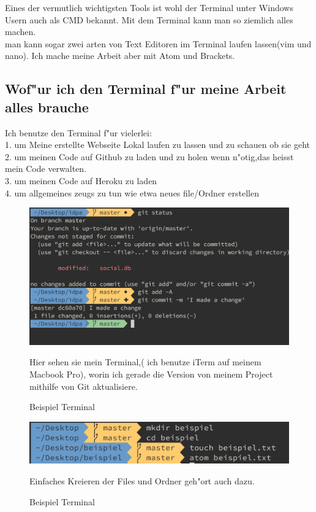 \documentclass{article}
\begin{document}
Eines der vermutlich wichtigsten Tools ist wohl der Terminal unter Windows Usern auch als CMD bekannt.
Mit dem Terminal kann man so ziemlich alles machen.\\
man kann sogar zwei arten von Text Editoren im Terminal laufen lassen(vim und nano).
Ich mache meine Arbeit aber mit Atom und Brackets.\\
\subsection{Wof"ur ich den Terminal f"ur meine Arbeit alles brauche}

Ich benutze den Terminal f"ur vielerlei:\\
1. um Meine erstellte Webseite Lokal laufen zu lassen und zu schauen ob sie geht\\
2. um meinen Code auf Github zu laden und zu holen wenn n"otig,das heisst mein Code verwalten.\\
3. um meinen Code auf Heroku zu laden\\
4. um allgemeines zeugs zu tun wie etwa neues file/Ordner erstellen\\



\begin{figure}[ht]
    \centering
    \includegraphics[width=.7\linewidth]{cli}
    \caption{Beispiel Terminal}
    \label{fig:sub1}{Hier sehen sie mein Terminal,(
    ich benutze iTerm auf meinem Macbook Pro),
    worin ich gerade
    die Version von meinem Project mithilfe von Git aktualisiere.}
    \end{figure}

    \cleardoublepage

    \begin{figure}[ht]
        \centering
        \includegraphics[width=.7\linewidth]{cli-einfaches}
        \caption{Beispiel Terminal}
        \label{fig:sub1}{Einfaches Kreieren der Files und Ordner geh"ort auch dazu.}
        \end{figure}
\end{document}
